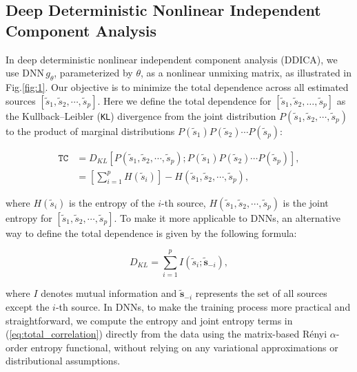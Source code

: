 \documentclass{article}
\begin{document}
\subsection{Deep Deterministic Nonlinear Independent Component Analysis}
\hspace{1.2em} In deep deterministic nonlinear independent component analysis (DDICA), we use \( \text{DNN} \, g_\theta \), parameterized by \( \theta \), as a nonlinear unmixing matrix, as illustrated in Fig.\ref{fig:1}. Our objective is to minimize the total dependence across all estimated sources $\left[\tilde{s}_1,\tilde{s}_2,\cdots,\tilde{s}_p\right]$. Here we define the total dependence for \(\left[\tilde{s}_1, \tilde{s}_2, \ldots, \tilde{s}_p\right]\) as the Kullback–Leibler (\texttt{KL}) divergence from the joint distribution $P(\tilde{s}_1,\tilde{s}_2,\cdots,\tilde{s}_p)$ to the product of marginal distributions $P(\tilde{s}_1)P(\tilde{s}_2)\cdots P(\tilde{s}_p)$: 

\begin{equation}
\begin{aligned}
    \texttt{TC} & = D_{KL}\left[P(\tilde{s}_1,\tilde{s}_2,\cdots,\tilde{s}_p);P(\tilde{s}_1)P(\tilde{s}_2)\cdots P(\tilde{s}_p)\right],\\
    & = \left[\sum_{i=1}^p H(\tilde{s}_i)\right] - H(\tilde{s}_1,\tilde{s}_2,\cdots,\tilde{s}_p),
\end{aligned}
\label{eq:total_correlation}
\end{equation}

\noindent where $H(\tilde{s}_i)$ is the entropy of the $i$-th source, $H(\tilde{s}_1,\tilde{s}_2,\cdots,\tilde{s}_p)$ is the joint entropy for $\left[\tilde{s}_1,\tilde{s}_2,\cdots,\tilde{s}_p\right]$. To make it more applicable to DNNs, an alternative way to define the total dependence is given by the following formula:

\begin{equation}
  D_{KL}=\sum_{i=1}^p I\left(\tilde{s}_i ; \tilde{\mathbf{s}}_{-i}\right),  
\end{equation}

\noindent where \( I \) denotes mutual information and \( \tilde{\mathbf{s}}_{-i} \) represents the set of all sources except the \( i \)-th source. In DNNs, to make the training process more practical and straightforward, we compute the entropy and joint entropy terms in (\ref{eq:total_correlation}) directly from the data using the matrix-based R\'enyi \(\alpha\)-order entropy functional, without relying on any variational approximations or distributional assumptions.
\end{document}
